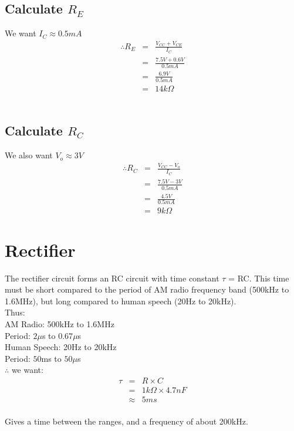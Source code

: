 \documentclass[a4paper,10pt]{report}
\begin{document}
\subsection{Calculate $R_{E}$}
We want $I_{C} \approx 0.5mA$
\begin{eqnarray*}
  \therefore R_{E} & = & \frac{V_{CC} + V_{CE}}{I_{C}} \\
  & = & \frac{7.5V + 0.6V}{0.5mA} \\
  & = & \frac{6.9V}{0.5mA} \\
  & = & 14k\Omega
\end{eqnarray*} \\

\subsection{Calculate $R_{C}$}
We also want $V_{o} \approx 3V$
\begin{eqnarray*}
  \therefore R_{C} & = & \frac{V_{CC} - V_{o}}{I_{C}} \\
  & = & \frac{7.5V - 3V}{0.5mA} \\
  & = & \frac{4.5V}{0.5mA} \\
  & = & 9k\Omega
\end{eqnarray*}

\section{Rectifier}
The rectifier circuit forms an RC circuit with time constant $\tau$ =
RC. This time must be short compared to the period of AM radio
frequency band (500kHz to 1.6MHz), but long compared to human speech
(20Hz to 20kHz).\\

\noindent Thus:  \\
AM Radio: 500kHz to 1.6MHz \\
Period: $2\mu$s to $0.67\mu$s \\

\noindent Human Speech: 20Hz to 20kHz  \\
Period: $50$ms to $50\mu$s\\

$\therefore$ we want:
\begin{eqnarray*}
\tau & = & R \times C \\
  & = & 1k\Omega \times 4.7nF \\
  & \approx & 5ms
\end{eqnarray*}\\
Gives a time between the ranges, and a frequency of about 200kHz.
\end{document}
